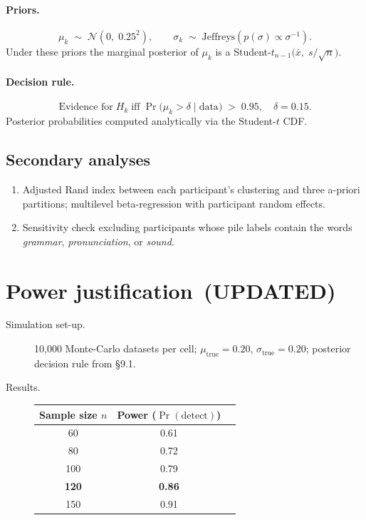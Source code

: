 \documentclass[12pt]{article}
\begin{document}
\begin{enumerate}
\paragraph{Priors.}
\[
\mu_k \;\sim\; \mathcal N(0,\;0.25^2),\qquad
\sigma_k \;\sim\; \text{Jeffreys}(p(\sigma)\propto\sigma^{-1}).
\]
Under these priors the marginal posterior of \(\mu_k\) is a
Student-\(t_{n-1}\bigl(\bar x,\; s/\sqrt n\bigr)\).

\paragraph{Decision rule.}
\[
\text{Evidence for}\;H_{k}\;\text{iff}
\;\Pr\!\bigl(\mu_k > \delta \mid \text{data}\bigr)\;>\;0.95,
\quad \delta = 0.15.
\]
Posterior probabilities computed analytically via the
Student-\(t\) CDF.

\subsection{Secondary analyses}
\begin{enumerate}
\item Adjusted Rand index between each participant’s clustering and three a-priori partitions; multilevel beta-regression with participant random effects.
\item Sensitivity check excluding participants whose pile labels contain the words \textit{grammar}, \textit{pronunciation}, or \textit{sound}.
\end{enumerate}

\section{Power justification \,(UPDATED)}

\begin{description}
\item[Simulation set-up.]  
10,000 Monte-Carlo datasets per cell; \(\mu_{\text{true}}=0.20\), \(\sigma_{\text{true}}=0.20\);
posterior decision rule from §9.1.

\item[Results.]  

\begin{center}
\begin{tabular}{@{}ccc@{}}
\toprule
Sample size $n$ & Power (\(\Pr(\text{detect})\)) \\
\midrule
60  & 0.61\\
80  & 0.72\\
100 & 0.79\\
\textbf{120} & \textbf{0.86}\\
150 & 0.91\\
\bottomrule
\end{tabular}
\end{center}


\end{description}
\end{enumerate}
\end{document}
